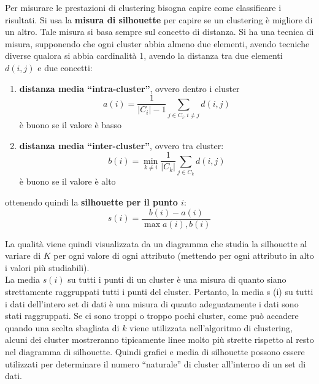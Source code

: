 Per misurare le prestazioni di clustering bisogna capire come classificare i
risultati. Si usa la \textbf{misura di silhouette} per capire se un clustering è
migliore di un altro. Tale misura si basa sempre sul concetto di distanza. Si
ha una tecnica di misura, supponendo che ogni cluster abbia almeno due
elementi, avendo tecniche diverse qualora si abbia cardinalità 1, avendo la
distanza tra due elementi $d(i, j)$ e due concetti:
\begin{enumerate}
  \item \textbf{distanza media ``intra-cluster''}, ovvero dentro i cluster
  \[a(i)=\frac{1}{|C_i|-1}\sum_{j\in C_i, i\neq j}d(i, j)\]
  è buono se il valore è basso
  \item \textbf{distanza media ``inter-cluster''}, ovvero tra cluster:
  \[b(i)=\min_{k\neq i}\frac{1}{|C_k|}\sum_{j\in C_k}d(i, j)\]
  è buono se il valore è alto
\end{enumerate}
ottenendo quindi la \textbf{silhouette per il punto $i$}:
\[s(i)=\frac{b(i)-a(i)}{\max{a(i), b(i)}}\]

La qualità viene quindi visualizzata da un diagramma che studia la silhouette al
variare di $K$ per ogni valore di ogni attributo (mettendo per ogni attributo in
alto i valori più studiabili).\\
La media $s(i)$ su tutti i punti di un cluster è una misura di quanto siano
strettamente raggruppati tutti i punti del cluster. Pertanto, la media s (i) su
tutti i dati dell'intero set di dati è una misura di quanto adeguatamente i dati
sono stati raggruppati. Se ci sono troppi o troppo pochi cluster, come può
accadere quando una scelta sbagliata di $k$ viene utilizzata nell'algoritmo di
clustering, alcuni dei cluster mostreranno tipicamente
linee molto più strette rispetto al resto nel diagramma di silhouette. Quindi
grafici e media di silhouette 
possono essere utilizzati per determinare il numero ``naturale'' di cluster
all'interno di un set di dati. 
